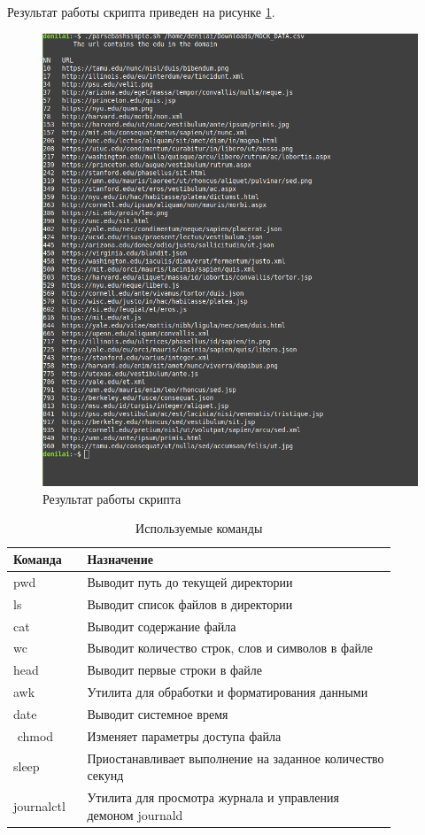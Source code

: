 \documentclass[a4paper,14pt]{extarticle}
\begin{document}
Результат работы скрипта приведен на рисунке \ref{fig:demo4}.
\begin{figure}[h!]
	\centering
	\includegraphics[width=0.8\linewidth]{images/3/demo4}
	\caption{Результат работы скрипта}
	\label{fig:demo4}
\end{figure}


\begin{table}[h!]
	\small
	\centering
	\label{tab:commands}
	\caption{Используемые команды}
	\begin{tabular}{|p{0.16\linewidth}|p{0.7\linewidth}|}
		\hline
		\textbf{Команда} & \textbf{Назначение} \\\hline
		pwd & Выводит путь до текущей директории \\\hline
		ls & Выводит список файлов в директории \\\hline
		cat & Выводит содержание файла \\\hline
		wc & Выводит количество строк,  слов и символов в файле \\\hline
		head & Выводит первые строки в файле \\\hline
		awk & Утилита для обработки и форматирования данными \\\hline
		date & Выводит системное время \\\hline$  $
		chmod & Изменяет параметры доступа файла \\\hline
		sleep & Приостанавливает выполнение на заданное количество секунд \\\hline 
		journalctl & Утилита для просмотра журнала и управления демоном journald \\\hline
	\end{tabular}
\end{table}
\end{document}
